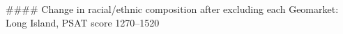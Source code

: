 #### Change in racial/ethnic composition after excluding each Geomarket: Long Island, PSAT score 1270–1520
